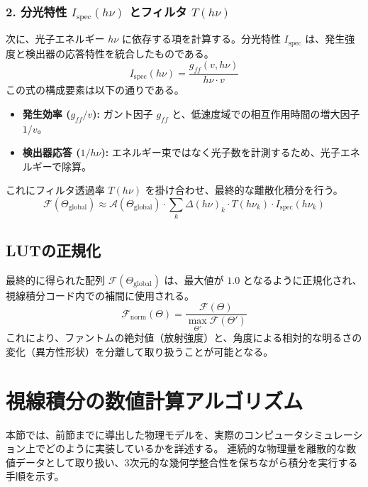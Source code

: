 \documentclass[a4paper,11pt]{bxjsarticle} %
\begin{document}
\subsubsection{2. 分光特性 $I_{\mathrm{spec}}(h\nu)$ とフィルタ $T(h\nu)$}
次に、光子エネルギー $h\nu$ に依存する項を計算する。分光特性 $I_{\mathrm{spec}}$ は、発生強度と検出器の応答特性を統合したものである。
\begin{equation}
    I_{\mathrm{spec}}(h\nu) = \frac{g_{ff}(v, h\nu)}{h\nu \cdot v}
\end{equation}
この式の構成要素は以下の通りである。
\begin{itemize}
    \item \textbf{発生効率 ($g_{ff}/v$):} ガント因子 $g_{ff}$ と、低速度域での相互作用時間の増大因子 $1/v$。
    \item \textbf{検出器応答 ($1/h\nu$):} エネルギー束ではなく光子数を計測するため、光子エネルギーで除算。
\end{itemize}
これにフィルタ透過率 $T(h\nu)$ を掛け合わせ、最終的な離散化積分を行う。
\begin{equation}
    \mathcal{F}(\Theta_{\mathrm{global}}) \approx \mathcal{A}(\Theta_{\mathrm{global}}) \cdot \sum_{k} \Delta(h\nu)_k \cdot T(h\nu_k) \cdot I_{\mathrm{spec}}(h\nu_k)
\end{equation}

\subsection{LUTの正規化}
最終的に得られた配列 $\mathcal{F}(\Theta_{\mathrm{global}})$ は、最大値が $1.0$ となるように正規化され、視線積分コード内での補間に使用される。
\begin{equation}
    \mathcal{F}_{\mathrm{norm}}(\Theta) = \frac{\mathcal{F}(\Theta)}{\max_{\Theta'} \mathcal{F}(\Theta')}
\end{equation}
これにより、ファントムの絶対値（放射強度）と、角度による相対的な明るさの変化（異方性形状）を分離して取り扱うことが可能となる。

\section{視線積分の数値計算アルゴリズム}

本節では、前節までに導出した物理モデルを、実際のコンピュータシミュレーション上でどのように実装しているかを詳述する。
連続的な物理量を離散的な数値データとして取り扱い、3次元的な幾何学整合性を保ちながら積分を実行する手順を示す。
\end{document}
